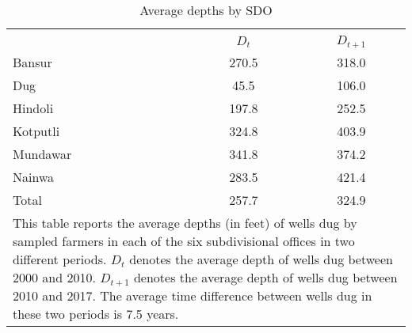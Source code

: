 \begin{table}[htbp]\centering
\def\sym#1{\ifmmode^{#1}\else\(^{#1}\)\fi}
\caption{Average depths by SDO\label{tab:DepthBySDO }}
\begin{tabular}{l*{1}{cc}}
\toprule
                    &\multicolumn{2}{c}{}     \\
                    &     $ D_t $& $ D_{t+1} $\\
\midrule
Bansur              &       270.5&       318.0\\
Dug                 &        45.5&       106.0\\
Hindoli             &       197.8&       252.5\\
Kotputli            &       324.8&       403.9\\
Mundawar            &       341.8&       374.2\\
Nainwa              &       283.5&       421.4\\
Total               &       257.7&       324.9\\
\bottomrule
\multicolumn{3}{p{0.3\hsize}}{\footnotesize This table reports the average depths (in feet) of wells dug by sampled farmers in each of the six subdivisional offices in two different periods. $ D_{t}$ denotes the average depth of wells dug between 2000 and 2010. $ D_{t+1}$ denotes the average depth of wells dug between 2010 and 2017. The average time difference between wells dug in these two periods is 7.5 years.}
\end{tabular}
\end{table}
